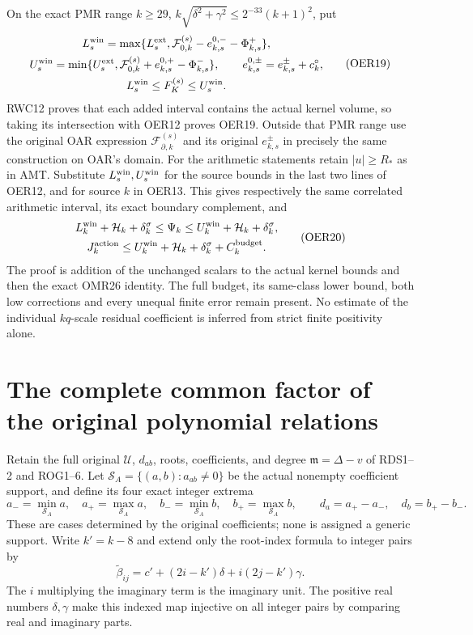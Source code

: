 \documentclass[11pt,a4paper]{article}
\begin{document}
On the exact PMR range $k\ge29$,
$k\sqrt{\delta^2+\gamma^2}\le2^{-33}(k+1)^2$, put
\[
\begin{gathered}
 L_s^{\rm win}=\max\{L_s^{\rm ext},
   \mathcal F_{0,k}^{(s)}-e_{k,s}^{0,-}-\Phi^+_{k,s}\},\\
 U_s^{\rm win}=\min\{U_s^{\rm ext},
   \mathcal F_{0,k}^{(s)}+e_{k,s}^{0,+}-\Phi^-_{k,s}\},
 \qquad e_{k,s}^{0,\pm}=e_{k,s}^{\pm}+c_k^\circ,\\
 L_s^{\rm win}\le F_K^{(s)}\le U_s^{\rm win}.
\end{gathered}\tag{OER19}
\]
RWC12 proves that each added interval contains the actual kernel
volume, so taking its intersection with OER12 proves OER19.
Outside that PMR range use the original OAR expression
$\mathcal F_{\partial,k}^{(s)}$ and its original $e_{k,s}^{\pm}$
in precisely the same construction on OAR's domain.
For the arithmetic statements retain $|u|\ge R_*$ as in AMT.
Substitute $L_s^{\rm win},U_s^{\rm win}$ for the source bounds
in the last two lines of OER12, and for source $k$ in OER13.
This gives respectively the same correlated arithmetic interval,
its exact boundary complement, and
\[
\begin{gathered}
 L_k^{\rm win}+\mathcal H_k+\delta_k^\sigma
 \le\Psi_k\le U_k^{\rm win}+\mathcal H_k+\delta_k^\sigma,\\
 J_k^{\rm action}\le U_k^{\rm win}+\mathcal H_k
                  +\delta_k^\sigma+C_k^{\rm budget}.
\end{gathered}\tag{OER20}
\]
The proof is addition of the unchanged scalars to the actual
kernel bounds and then the exact OMR26 identity. The full
budget, its same-class lower bound, both low corrections and
every unequal finite error remain present. No estimate of
the individual $kq$-scale residual coefficient is inferred
from strict finite positivity alone.



\clearpage
\section{The complete common factor of the original polynomial relations}
\label{sec:RCF}

Retain the full original $\mathcal U$, $d_{ab}$, roots, coefficients,
and degree $\mathfrak m=\Delta-v$ of RDS1--2 and ROG1--6.
Let $\mathcal S_A=\{(a,b):a_{ab}\ne0\}$ be the actual nonempty
coefficient support, and define its four exact integer extrema
\[
 a_-=\min_{\mathcal S_A}a,\quad a_+=\max_{\mathcal S_A}a,\quad
 b_-=\min_{\mathcal S_A}b,\quad b_+=\max_{\mathcal S_A}b,\qquad
 d_a=a_+-a_-,\quad d_b=b_+-b_-.
 \tag{RCF1}
\]
These are cases determined by the original coefficients; none is
assigned a generic support. Write $k'=k-8$ and extend only the
root-index formula to integer pairs by
\[
 \widetilde\beta_{ij}=c'+(2i-k')\delta+i(2j-k')\gamma.
 \tag{RCF2}
\]
The $i$ multiplying the imaginary term is the imaginary unit.
The positive real numbers $\delta,\gamma$ make this indexed map
injective on all integer pairs by comparing real and imaginary parts.
\end{document}
